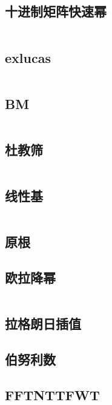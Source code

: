 \documentclass[a4paper,11pt]{article}
\begin{document}
\subsection{十进制矩阵快速幂}
\inputminted[breaklines]{c++}{Math/快速幂.cpp}

\subsection{exlucas}
\inputminted[breaklines]{c++}{Math/exlucas.cpp}

\subsection{BM}
\inputminted[breaklines]{c++}{Math/BM.cpp}

\subsection{杜教筛}
\inputminted[breaklines]{c++}{Math/杜教筛.cpp}

\subsection{线性基}
\inputminted[breaklines]{c++}{Math/线性基.cpp}

\subsection{原根}


\subsection{欧拉降幂}
\inputminted[breaklines]{c++}{Math/欧拉降幂.cpp}

\subsection{拉格朗日插值}


\subsection{伯努利数}


\subsection{FFTNTTFWT}

\end{document}
